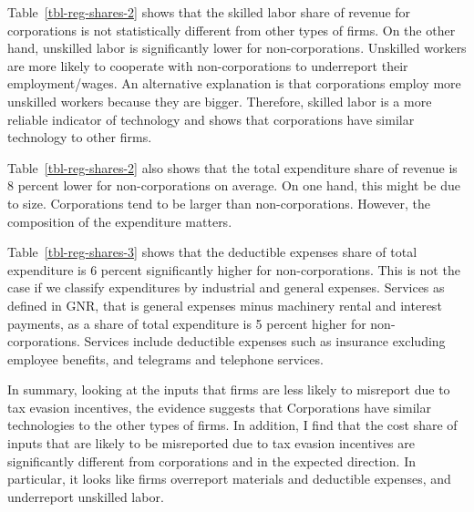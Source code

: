 \documentclass[
  12pt]{article}
\theoremstyle{definition}
\theoremstyle{remark}
\begin{document}
Table~\ref{tbl-reg-shares-2} shows that the skilled labor share of
revenue for corporations is not statistically different from other types
of firms. On the other hand, unskilled labor is significantly lower for
non-corporations. Unskilled workers are more likely to cooperate with
non-corporations to underreport their employment/wages. An alternative
explanation is that corporations employ more unskilled workers because
they are bigger. Therefore, skilled labor is a more reliable indicator
of technology and shows that corporations have similar technology to
other firms.

Table~\ref{tbl-reg-shares-2} also shows that the total expenditure share
of revenue is 8 percent lower for non-corporations on average. On one
hand, this might be due to size. Corporations tend to be larger than
non-corporations. However, the composition of the expenditure matters.

Table~\ref{tbl-reg-shares-3} shows that the deductible expenses share of
total expenditure is 6 percent significantly higher for
non-corporations. This is not the case if we classify expenditures by
industrial and general expenses. Services as defined in GNR, that is
general expenses minus machinery rental and interest payments, as a
share of total expenditure is 5 percent higher for non-corporations.
Services include deductible expenses such as insurance excluding
employee benefits, and telegrams and telephone services.

In summary, looking at the inputs that firms are less likely to
misreport due to tax evasion incentives, the evidence suggests that
Corporations have similar technologies to the other types of firms. In
addition, I find that the cost share of inputs that are likely to be
misreported due to tax evasion incentives are significantly different
from corporations and in the expected direction. In particular, it looks
like firms overreport materials and deductible expenses, and underreport
unskilled labor.
\end{document}
